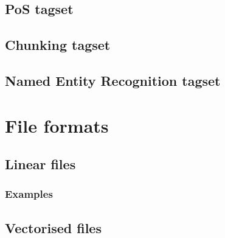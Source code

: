 \documentclass[12pt]{article}
\begin{document}
        \subsection{PoS tagset}
        \label{subsec:tags-pos}
        

        \subsection{Chunking tagset}
        \label{subsec:tags-chunking}
        

        \subsection{Named Entity Recognition tagset}
        \label{subsec:tags-ner}
        

        \subsection{\LeFFFFull}
        \label{subsec:lefff}
        
    
    \section{File formats}
    \label{sec:file-formats}
    

        \subsection{Linear files}
        \label{subsec:file-linear}
        

            \subsubsection{Examples}
            \label{subsubsec:file-linear-examples}
            

        \subsection{Vectorised files}
        \label{subsec:file-vectorised}
        
\end{document}
